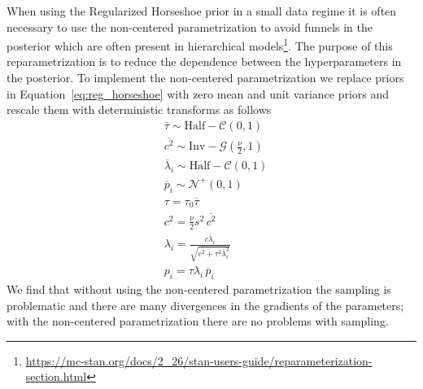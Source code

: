 \documentclass[linenumbers,modern]{aastex62}
\begin{document}
When using the Regularized Horseshoe prior in a small data regime it is often necessary to use the non-centered parametrization to avoid funnels in the posterior which are often present in hierarchical models\footnote{\url{https://mc-stan.org/docs/2_26/stan-users-guide/reparameterization-section.html}}.
The purpose of this reparametrization is to reduce the dependence between the hyperparameters in the posterior.
To implement the non-centered parametrization we replace priors in Equation~\ref{eq:reg_horseshoe} with zero mean and unit variance priors and rescale them with deterministic transforms as follows
\begin{equation}
\begin{aligned}
    &\overline{\tau} \sim \mathrm{Half}-\mathcal{C}\left(0, 1\right)\\
    &\overline{c^{2}}  \sim \mathrm{Inv}-\mathcal{G}\left(\frac{\nu}{2}, 1\right) \\
    &\overline{\lambda}_{i}  \sim \mathrm{Half}-\mathcal{C}(0,1) \\
    &\overline{p}_{i}  \sim \mathcal{N}^+\left(0, 1\right)\\
    &\tau=\tau_0\overline{\tau}\\
    &c^2=\frac{\nu}{2}s^2\,\overline{c^2}\\
    &\lambda_{i} =\frac{c \overline{\lambda}_{i}}{\sqrt{c^{2}+\tau^{2} \overline{\lambda}_{i}^{2}}} \\
    &p_i = \tau\lambda_i\,\overline{p}_i
\end{aligned}
    \label{eq:reg_horseshoe_noncentered}
\end{equation}
We find that without using the non-centered parametrization the sampling is problematic and there are many divergences in the gradients of the parameters; with the non-centered parametrization there are no problems with sampling.

\clearpage
\end{document}
